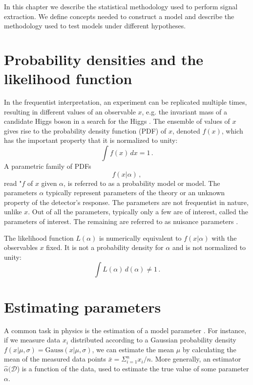 In this chapter we describe the statistical methodology used to perform signal extraction. We define concepts needed to construct a model and describe the methodology used to test models under different hypotheses.

\section{Probability densities and the likelihood function}

In the frequentist interpretation, an experiment can be replicated multiple times, resulting in different values of an observable $x$, e.g. the invariant mass of a candidate Higgs boson in a search for the Higgs \cite{2011-Statistics-Cranmer}. The ensemble of values of $x$ gives rise to the probability density function (PDF) of $x$, denoted $f(x)$, which has the important property that it is normalized to unity:
\begin{equation*}
    \int f(x) \, dx = 1 \,.
\end{equation*}
A parametric family of PDFs
\begin{equation*}
    f(x|\alpha) \, ,
\end{equation*}
read "$f$ of $x$ given $\alpha$, is referred to as a probability model or model. The parameters $\alpha$ typically represent parameters of the theory or an unknown property of the detector's response. The parameters are not frequentist in nature, unlike $x$. Out of all the parameters, typically only a few are of interest, called the parameters of interest. The remaining are referred to as nuisance parameters \cite{2011-Statistics-Cranmer}.

The likelihood function $L(\alpha)$ is numerically equivalent to $f(x|\alpha)$ with the observables $x$ fixed. It is not a probability density for $\alpha$ and is not normalized to unity:
\begin{equation*}
    \int L(\alpha) \, d(\alpha) \neq 1 \, .
\end{equation*}

\section{Estimating parameters}

A common task in physics is the estimation of a model parameter \cite{2011-Statistics-Cranmer}. For instance, if we measure data $x_i$ distributed according to a Gaussian probability density $f(x | \mu, \sigma) = \text{Gauss}(x|\mu, \sigma)$, we can estimate the mean $\mu$ by calculating the mean of the measured data points $\bar{x} = \Sigma_{i = 1}^{n} x_i / n$. More generally, an estimator $\hat{\alpha}(\mathcal{D}$) is a function of the data, used to estimate the true value of some parameter $\alpha$.

